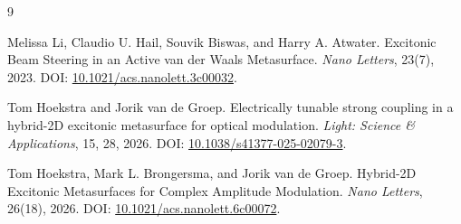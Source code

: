 \documentclass[UTF8,a4paper,12pt]{ctexart}
\begin{document}
\begin{thebibliography}{9}

Melissa Li, Claudio U. Hail, Souvik Biswas, and Harry A. Atwater.
\newblock Excitonic Beam Steering in an Active van der Waals Metasurface.
\newblock \emph{Nano Letters}, 23(7), 2023.
\newblock DOI: \href{https://doi.org/10.1021/acs.nanolett.3c00032}{10.1021/acs.nanolett.3c00032}.

Tom Hoekstra and Jorik van de Groep.
\newblock Electrically tunable strong coupling in a hybrid-2D excitonic metasurface for optical modulation.
\newblock \emph{Light: Science \& Applications}, 15, 28, 2026.
\newblock DOI: \href{https://doi.org/10.1038/s41377-025-02079-3}{10.1038/s41377-025-02079-3}.

Tom Hoekstra, Mark L. Brongersma, and Jorik van de Groep.
\newblock Hybrid-2D Excitonic Metasurfaces for Complex Amplitude Modulation.
\newblock \emph{Nano Letters}, 26(18), 2026.
\newblock DOI: \href{https://doi.org/10.1021/acs.nanolett.6c00072}{10.1021/acs.nanolett.6c00072}.

\end{thebibliography}
\end{document}
